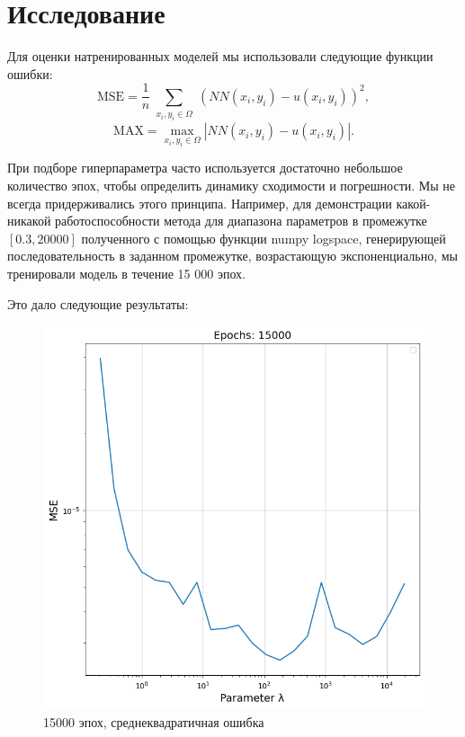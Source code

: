 \section{Исследование}

Для оценки натренированных моделей мы использовали следующие функции ошибки:
\[
    \text{MSE} = \frac{1}{n} \sum_{\substack{x_i, y_i \in \Omega }} \left( NN(x_i, y_i) - u(x_i, y_i) \right)^2,
\]
\[
    \text{MAX} = \max_{x_i,y_i \in \Omega} \left| NN(x_i, y_i) - u(x_i, y_i) \right|.
\]

При подборе гиперпараметра часто используется достаточно небольшое количество эпох, чтобы определить динамику сходимости и погрешности.
Мы не всегда придерживались этого принципа. Например, для демонстрации какой-никакой работоспособности метода для диапазона параметров
в промежутке $[0.3, 20000]$ полученного с помощью функции
\textrm{numpy logspace}, генерирующей последовательность в заданном промежутке, возрастающую экспоненциально, мы тренировали модель в течение
15 000 эпох.

Это дало следующие результаты:

\begin{figure}[ht!]
    \centering
    \includegraphics[width=0.9\hsize]{images/1.png}
    \caption{15000 эпох, среднеквадратичная ошибка}
\end{figure}

